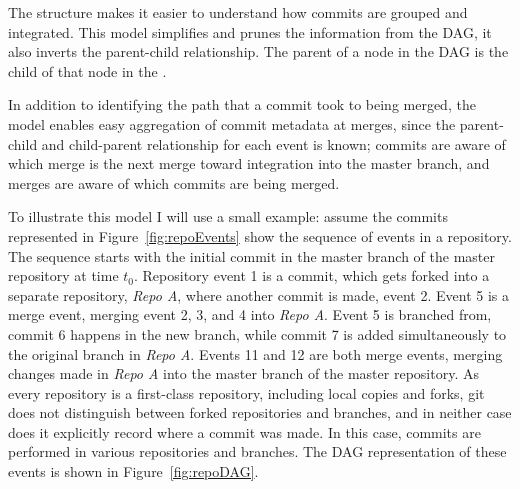 The structure makes it easier to understand how commits are grouped and
integrated. This model simplifies and prunes the information from the
DAG, it also inverts the parent-child relationship. The parent of a node
in the DAG is the child of that node in the \mt{}.

In addition to identifying the path that a commit took to being merged,
the model enables easy aggregation of commit metadata at merges,
since the parent-child and child-parent relationship for each event
is known;
commits are aware of which merge is the next merge toward integration
into the master branch, and merges are aware of which commits are being
merged.

To illustrate this model I will use a small example: assume the commits
represented in Figure~\ref{fig:repoEvents} show the sequence of events
in a repository. The sequence starts with the initial commit in the
master branch of the master repository at time $t_0$. Repository event 1
is a commit, which gets forked into a separate repository, \textit{Repo
  A}, where another commit is made, event 2. Event 5 is a merge event,
merging event 2, 3, and 4 into \textit{Repo A}. Event 5 is branched
from, commit 6 happens in the new branch, while commit 7 is added
simultaneously to the original branch in \textit{Repo A}. Events 11 and
12 are both merge events, merging changes made in \textit{Repo A} into
the master branch of the master repository. As every repository is a
first-class repository, including local copies and forks, git does not
distinguish between forked repositories and branches, and in neither
case does it explicitly record where a commit was made. In this case,
commits are performed in various repositories and branches. The DAG
representation of these events is shown in Figure~\ref{fig:repoDAG}.


